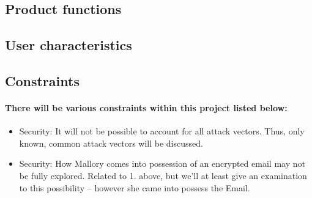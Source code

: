 \subsection{Product functions}



\subsection{User characteristics}

\subsection{Constraints}
\paragraph{There will be various constraints within this project listed below:}
\begin{itemize}
\item Security: It will not be possible to account for all attack vectors. Thus, only known, common attack vectors will be discussed.
\item Security: How Mallory comes into possession of an encrypted email may not be fully explored. Related to 1. above, but we'll at least give an examination to this possibility -- however she came into possess the Email.
\end{itemize}



